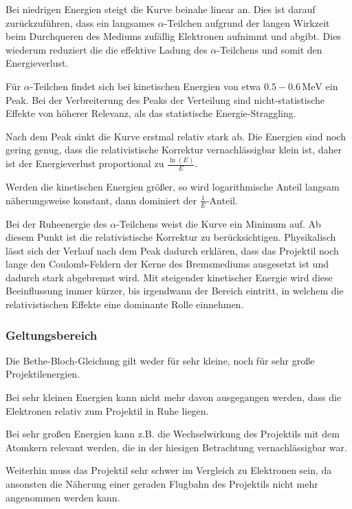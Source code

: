 \documentclass[12pt,a4paper]{scrartcl}
\numberwithin{equation}{section} %
\renewcommand{\[}{} %
\renewcommand{\]}{\noindent} %
\begin{document}
Bei niedrigen Energien steigt die Kurve beinahe linear an. Dies ist
darauf zurückzuführen, dass ein langsames \(\alpha\)-Teilchen aufgrund
der langen Wirkzeit beim Durchqueren des Mediums zufällig Elektronen
aufnimmt und abgibt. Dies wiederum reduziert die die effektive Ladung
des \(\alpha\)-Teilchens und somit den Energieverlust.

Für \(\alpha\)-Teilchen findet sich bei kinetischen Energien von etwa
\(0.5-0.6\mathrm{\,MeV}\) ein Peak. Bei der Verbreiterung des Peaks der
Verteilung sind nicht-statistische Effekte von höherer Relevanz, als das
statistische Energie-Straggling.

Nach dem Peak sinkt die Kurve erstmal relativ stark ab. Die Energien
sind noch gering genug, dass die relativistische Korrektur
vernachlässigbar klein ist, daher ist der Energieverlust proportional zu
\(\frac{\ln(E)}{E}\).

Werden die kinetischen Energien größer, so wird logarithmische Anteil
langsam näherungsweise konstant, dann dominiert der
\(\frac{1}{E}\)-Anteil.

Bei der Ruheenergie des \(\alpha\)-Teilchens weist die Kurve ein Minimum
auf. Ab diesem Punkt ist die relativistische Korrektur zu
berücksichtigen. Physikalisch lässt sich der Verlauf nach dem Peak
dadurch erklären, dass das Projektil noch lange den Coulomb-Feldern der
Kerne des Bremsmediums ausgesetzt ist und dadurch stark abgebremst wird.
Mit steigender kinetischer Energie wird diese Beeinflussung immer
kürzer, bis irgendwann der Bereich eintritt, in welchem die
relativistischen Effekte eine dominante Rolle einnehmen.

\hypertarget{geltungsbereich}{%
\subsubsection{Geltungsbereich}\label{geltungsbereich}}

Die Bethe-Bloch-Gleichung gilt weder für sehr kleine, noch für sehr
große Projektilenergien.

Bei sehr kleinen Energien kann nicht mehr davon ausgegangen werden, dass
die Elektronen relativ zum Projektil in Ruhe liegen.

Bei sehr großen Energien kann z.B. die Wechselwirkung des Projektils mit
dem Atomkern relevant werden, die in der hiesigen Betrachtung
vernachlässigbar war.

Weiterhin muss das Projektil sehr schwer im Vergleich zu Elektronen
sein, da ansonsten die Näherung einer geraden Flugbahn des Projektils
nicht mehr angenommen werden kann.
\end{document}
